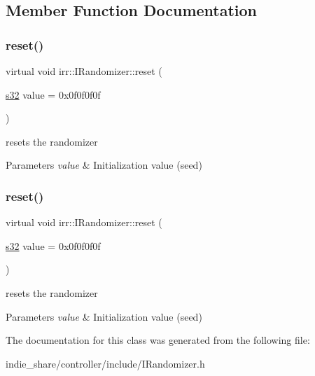 \subsection{Member Function Documentation}
\mbox{\label{classirr_1_1IRandomizer_ac9d7c9464698f6e183992fb895fa5ac4}} 
\subsubsection{\texorpdfstring{reset()}{reset()}\hspace{0.1cm}{\footnotesize\ttfamily [1/2]}}
{\footnotesize\ttfamily virtual void irr\+::\+I\+Randomizer\+::reset (\begin{DoxyParamCaption}\item[{\hyperlink{namespaceirr_ac66849b7a6ed16e30ebede579f9b47c6}{s32}}]{value = {\ttfamily 0x0f0f0f0f} }\end{DoxyParamCaption})\hspace{0.3cm}{\ttfamily [pure virtual]}}



resets the randomizer 


\begin{DoxyParams}{Parameters}
{\em value} & Initialization value (seed) \\
\hline
\end{DoxyParams}
\mbox{\label{classirr_1_1IRandomizer_ac9d7c9464698f6e183992fb895fa5ac4}} 
\subsubsection{\texorpdfstring{reset()}{reset()}\hspace{0.1cm}{\footnotesize\ttfamily [2/2]}}
{\footnotesize\ttfamily virtual void irr\+::\+I\+Randomizer\+::reset (\begin{DoxyParamCaption}\item[{\hyperlink{namespaceirr_ac66849b7a6ed16e30ebede579f9b47c6}{s32}}]{value = {\ttfamily 0x0f0f0f0f} }\end{DoxyParamCaption})\hspace{0.3cm}{\ttfamily [pure virtual]}}



resets the randomizer 


\begin{DoxyParams}{Parameters}
{\em value} & Initialization value (seed) \\
\hline
\end{DoxyParams}


The documentation for this class was generated from the following file\+:\begin{DoxyCompactItemize}
\item 
indie\+\_\+share/controller/include/I\+Randomizer.\+h\end{DoxyCompactItemize}
